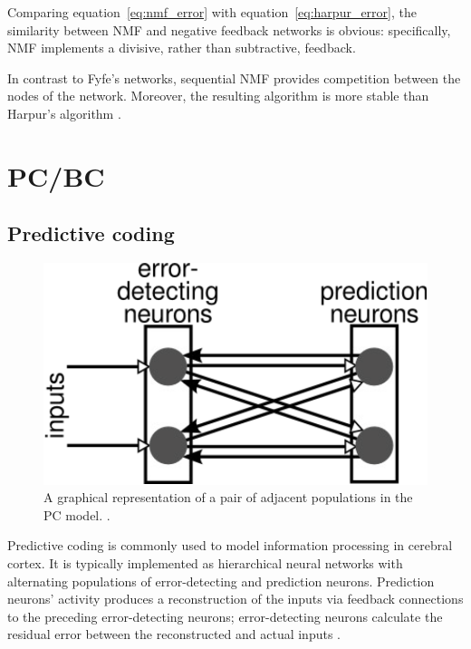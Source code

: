 \documentclass[11pt,a4paper]{report}
\begin{document}
			Comparing equation~\ref{eq:nmf_error} with equation~\ref{eq:harpur_error}, the similarity between NMF and negative feedback networks is obvious: specifically, NMF implements a divisive, rather than subtractive, feedback.
			
			In contrast to Fyfe's networks, sequential NMF provides competition between the nodes of the network. Moreover, the resulting algorithm is more stable than Harpur's algorithm \cite{spratling2009unsupervised}.
	
		\newpage

		\section{PC/BC}
			\label{sec:pcbc}
			\subsection{Predictive coding}
				\begin{figure}[h]
					\centering
					\includegraphics[scale=0.6]{prediction}
					\caption{A graphical representation of a pair of adjacent populations in the PC model. \cite{spratling2014predictive}.}
					\label{fig:predictive}
				\end{figure}
				
				Predictive coding is commonly used to model information processing in cerebral cortex. It is typically implemented as hierarchical neural networks
				with alternating populations of error-detecting and prediction neurons. Prediction neurons' activity produces a reconstruction of the inputs
				via feedback connections to the preceding error-detecting neurons; error-detecting neurons calculate the residual error between
				the reconstructed and actual inputs \cite{spratling2014predictive}.
\end{document}
